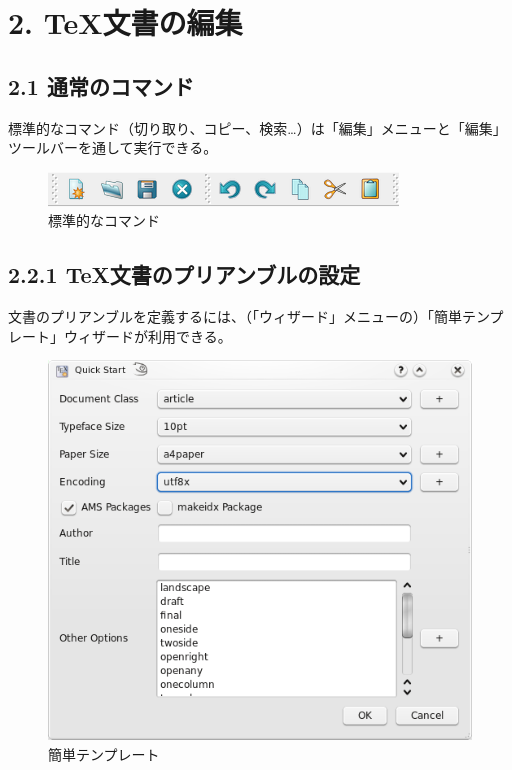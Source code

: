 \documentclass[]{book}
\makeatletter
\def\maxwidth{\ifdim\Gin@nat@width>\linewidth\linewidth
\else\Gin@nat@width\fi}
\let\Oldincludegraphics\includegraphics
\renewcommand{\includegraphics}[1]{\Oldincludegraphics[width=\maxwidth]{#1}}
\makeatother
\begin{document}
\chapter{2. TeX文書の編集}

\section{2.1 通常のコマンド}

標準的なコマンド（切り取り、コピー、検索\ldots{}）は「編集」メニューと「編集」ツールバーを通して実行できる。

\begin{figure}[htbp]
\centering
\includegraphics{doc1.png}
\caption{標準的なコマンド}
\end{figure}

\section{2.2.1 TeX文書のプリアンブルの設定}

文書のプリアンブルを定義するには、（「ウィザード」メニューの）「簡単テンプレート」ウィザードが利用できる。

\begin{figure}[htbp]
\centering
\includegraphics{doc2.png}
\caption{簡単テンプレート}
\end{figure}
\end{document}
